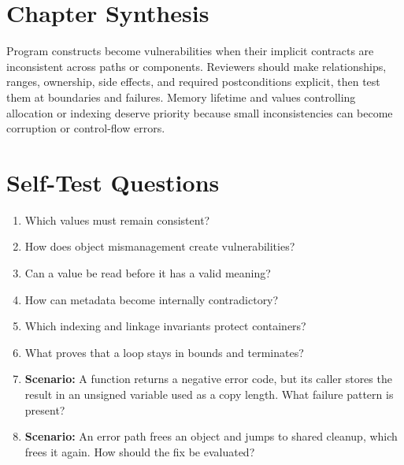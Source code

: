 \documentclass[11pt,letterpaper]{article}
\begin{document}
\section{Chapter Synthesis}
Program constructs become vulnerabilities when their implicit contracts are inconsistent across paths or components. Reviewers should make relationships, ranges, ownership, side effects, and required postconditions explicit, then test them at boundaries and failures. Memory lifetime and values controlling allocation or indexing deserve priority because small inconsistencies can become corruption or control-flow errors.
\section{Self-Test Questions}
\begin{enumerate}
\item Which values must remain consistent?
\item How does object mismanagement create vulnerabilities?
\item Can a value be read before it has a valid meaning?
\item How can metadata become internally contradictory?
\item Which indexing and linkage invariants protect containers?
\item What proves that a loop stays in bounds and terminates?
\item \textbf{Scenario:} A function returns a negative error code, but its caller stores the result in an unsigned variable used as a copy length. What failure pattern is present?
\item \textbf{Scenario:} An error path frees an object and jumps to shared cleanup, which frees it again. How should the fix be evaluated?
\end{enumerate}
\clearpage
\end{document}
